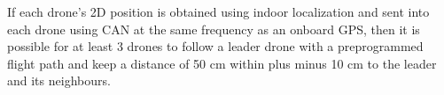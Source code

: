 If each drone’s 2D position is obtained using indoor localization and sent into each drone using CAN at the same frequency as an onboard GPS, then it is possible for at least 3 drones to follow a leader drone with a preprogrammed flight path and keep a distance of 50 cm within plus minus 10 cm to the leader and its neighbours.

